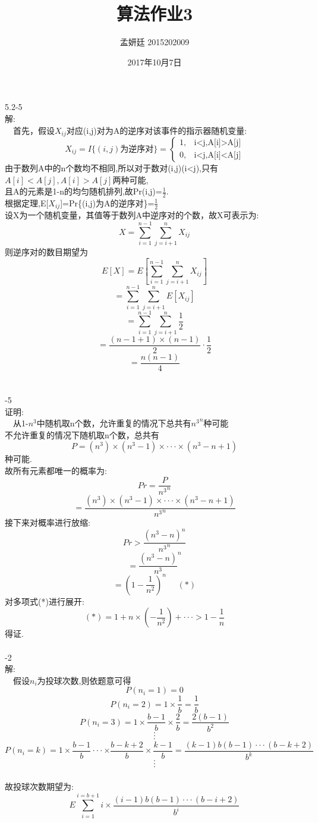 \documentclass[19pt,a4paper]{article}
\title{算法作业3}
\author{孟妍廷 2015202009}
\date{2017年10月7日}
\begin{document}
\maketitle

5.2-5\\
\indent 解:\\
\indent \ \ 首先，假设$X_{ij}$对应(i,j)对为A的逆序对该事件的指示器随机变量:
$$X_{ij}=I\{(i,j)为逆序对\}=
\begin{cases}
1,& \text{i<j,A[i]>A[j]}\\
0,& \text{i<j,A[i]<A[j]}
\end{cases}$$
\indent 由于数列A中的n个数均不相同,所以对于数对(i,j)(i<j),只有$A[i]<A[j],A[i]>A[j]$两种可能,\\
\indent 且A的元素是1-n的均匀随机排列,故Pr{(i,j)}=$\frac{1}{2}$.\\
\indent 根据定理,E[$X_{ij}$]=Pr\{(i,j)为A的逆序对\}=$\frac{1}{2}$\\
\indent 设X为一个随机变量，其值等于数列A中逆序对的个数，故X可表示为:\\
\begin{equation*}
X = \sum_{i=1}^{n-1}\sum_{j=i+1}^nX_{ij}
\end{equation*}
\indent 则逆序对的数目期望为
$$E[X] = E[ \sum_{i=1}^{n-1}\sum_{j=i+1}^nX_{ij}] $$
$$= \sum_{i=1}^{n-1}\sum_{j=i+1}^nE[X_{ij}] $$
$$=\sum_{i=1}^{n-1}\sum_{j=i+1}^n\frac{1}{2}$$
$$=\frac{(n-1+1)\times(n-1)}{2}\cdot\frac{1}{2}$$
$$=\frac{n(n-1)}{4}$$
\\
\\
-5\\
\indent 证明:\\
\indent\ \ 从1-$n^3$中随机取n个数，允许重复的情况下总共有${n^3}^n$种可能\\
\indent 不允许重复的情况下随机取n个数，总共有
$$P=(n^3)\times(n^3-1)\times\cdot\cdot\cdot\times(n^3-n+1)$$
\indent 种可能.\\
\indent 故所有元素都唯一的概率为:\\
$$Pr=\frac{P}{{n^3}^n}$$
$$=\frac{(n^3)\times(n^3-1)\times\cdot\cdot\cdot\times(n^3-n+1)}{{n^3}^n}$$
\indent 接下来对概率进行放缩:
$$Pr>\frac{{(n^3-n)}^n}{{n^3}^n}$$
$$={\frac{(n^3-n)}{n^3}}^n$$
$$={(1-\frac{1}{n^2})}^n\ \ \ \ \ \ (*)$$
\indent 对多项式(*)进行展开:
$$(*)=1+n\times(-\frac{1}{n^2})+\cdot\cdot\cdot>1-\frac{1}{n}$$
\indent 得证.
\\
\\
-2\\
\indent 解:\\
\indent\ \ 假设$n_i$为投球次数,则依题意可得
$$P(n_i=1)=0$$
$$P(n_i=2)=1\times\frac{1}{b}=\frac{1}{b}$$
$$P(n_i=3)=1\times\frac{b-1}{b}\times\frac{2}{b}=\frac{2(b-1)}{b^2}$$
$$\cdot$$
$$\cdot$$
$$\cdot$$
$$P(n_i=k)=1\times\frac{b-1}{b}\cdot\cdot\cdot\times\frac{b-k+2}{b}\times\frac{k-1}{b}=\frac{(k-1)b(b-1)\cdot\cdot\cdot(b-k+2)}{b^{k}}$$
$$\cdot$$
$$\cdot$$
$$\cdot$$
\\
\indent 故投球次数期望为:
$$E\sum_{i=1}^{i=b+1}i\times\frac{(i-1)b(b-1)\cdot\cdot\cdot(b-i+2)}{b^{i}}$$
\end{document}
